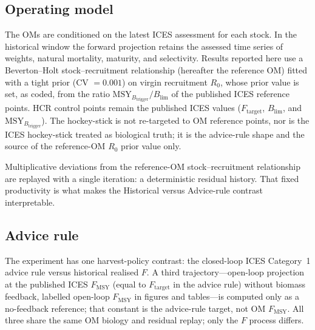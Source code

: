 \documentclass[11pt,a4paper]{article}
\newcommand{\Fmsy}{F_{\mathrm{MSY}}}
\newcommand{\Blim}{B_{\lim}}
\newcommand{\Btrig}{\mathrm{MSY}_{B_{\mathrm{trigger}}}}
\newcommand{\Ftar}{F_{\mathrm{target}}}
\begin{document}
\subsection{Operating model}

The OMs are conditioned on the latest ICES assessment for each stock. In the historical window the forward projection retains the assessed time series of weights, natural mortality, maturity, and selectivity. Results reported here use a Beverton--Holt stock--recruitment relationship
\citep{beverton1957dynamics} (hereafter the reference OM) fitted with a
tight prior (CV $=0.001$) on virgin recruitment $R_0$, whose prior value
is set, as coded, from the ratio $\Btrig/\Blim$ of the published ICES
reference points.
HCR control points remain the published ICES values ($\Ftar$, $\Blim$,
and $\Btrig$). The hockey-stick is not re-targeted to OM reference
points, nor is the ICES hockey-stick treated as biological truth; it is
the advice-rule shape and the source of the reference-OM $R_0$ prior
value only.

Multiplicative deviations from the reference-OM stock--recruitment
relationship are replayed with a single iteration: a deterministic
residual history. That fixed productivity is what makes the Historical
versus Advice-rule contrast interpretable.

\subsection{Advice rule}
\label{sec:hcr}

The experiment has one harvest-policy contrast: the closed-loop ICES
Category~1 advice rule versus historical realised $F$. A third
trajectory---open-loop projection at the published ICES
$F_{\mathrm{MSY}}$ (equal to $\Ftar$ in the advice rule) without
biomass feedback, labelled open-loop $\Fmsy$ in figures and tables---is
computed only as a no-feedback reference; that constant is the
advice-rule target, not OM $\Fmsy$. All three share the same OM biology
and residual replay; only the $F$ process differs.
\end{document}
